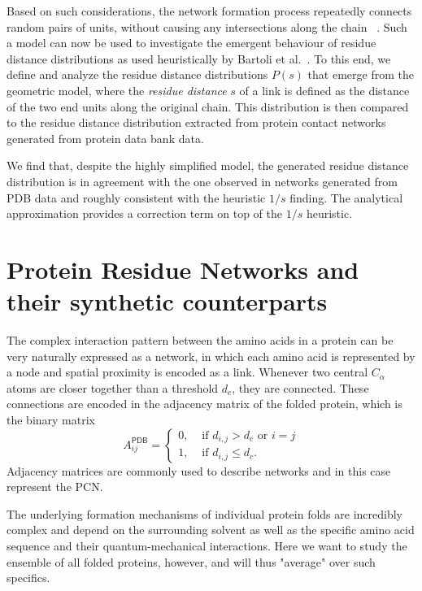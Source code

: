 \documentclass[
reprint,
twocolumn,
amsmath,amssymb,superscriptaddress,aps,
pre]{revtex4-1}
\begin{document}
Based on such considerations, the network formation process repeatedly connects random pairs of units, without causing any intersections along the chain ~\cite{molkenthin2016scaling}. Such a model can now be used to investigate the emergent behaviour of residue distance distributions as used heuristically by Bartoli et al.~\cite{bartoli2008effect}. To this end, we define and analyze the residue distance distributions $P(s)$ that emerge from the geometric model, where the \emph{residue distance} $s$ of a link is defined as the distance of the two end units along the original chain.
This distribution is then compared to the residue distance distribution extracted from protein contact networks generated from protein data bank data. 

We find that, despite the highly simplified model, the generated residue distance distribution is in agreement with the one observed in networks generated from PDB data and roughly consistent with the heuristic $1/s$ finding. The analytical approximation provides a correction term on top of the $1/s$ heuristic.


\section*{Protein Residue Networks and their synthetic counterparts}
The complex interaction pattern between the amino acids in a protein can be very naturally expressed as a network, in which each amino acid is represented by a node and spatial proximity is encoded as a link. Whenever two central $C_\alpha$ atoms are closer together than a threshold $d_c$, they are connected. These connections are encoded in the adjacency matrix of the folded protein, which is the binary matrix
\begin{equation}
  A^{\textsf{PDB}}_{ij}=
  \begin{cases}
   0, & \text{ if } d_{i,j}>d_c \text{ or } i=j\\
      1, & \text{ if } d_{i,j}\leq d_c .
      \end{cases}
    \label{eq:aij}
\end{equation}
Adjacency matrices are commonly used to describe networks and in this case represent the PCN.

The underlying formation mechanisms of individual protein folds are incredibly complex and depend on the surrounding solvent as well as the specific amino acid sequence and their quantum-mechanical interactions. Here we want to study the ensemble of all folded proteins, however, and will thus "average" over such specifics.
\end{document}
